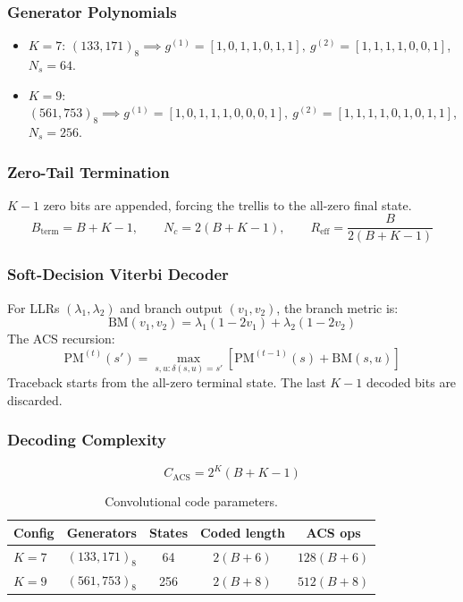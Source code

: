 \documentclass[12pt, a4paper]{article}
\begin{document}
\subsubsection{Generator Polynomials}
\begin{itemize}
    \item $K=7$: $(133,171)_8 \implies g^{(1)}=[1,0,1,1,0,1,1],\ g^{(2)}=[1,1,1,1,0,0,1]$, $N_s=64$.
    \item $K=9$: $(561,753)_8 \implies g^{(1)}=[1,0,1,1,1,0,0,0,1],\ g^{(2)}=[1,1,1,1,0,1,0,1,1]$, $N_s=256$.
\end{itemize}

\subsubsection{Zero-Tail Termination}
$K-1$ zero bits are appended, forcing the trellis to the all-zero final state.
\begin{equation}
B_{\text{term}} = B + K - 1,\qquad N_c = 2(B+K-1),\qquad R_{\text{eff}} = \frac{B}{2(B+K-1)}
\end{equation}

\subsubsection{Soft-Decision Viterbi Decoder}
For LLRs $(\lambda_1,\lambda_2)$ and branch output $(v_1,v_2)$, the branch metric is:
\begin{equation}
\text{BM}(v_1,v_2) = \lambda_1(1-2v_1) + \lambda_2(1-2v_2)
\end{equation}
The ACS recursion:
\begin{equation}
\text{PM}^{(t)}(s') = \max_{s,u:\delta(s,u)=s'}\left[\text{PM}^{(t-1)}(s) + \text{BM}(s,u)\right]
\end{equation}
Traceback starts from the all-zero terminal state. The last $K-1$ decoded bits are discarded.

\subsubsection{Decoding Complexity}
\begin{equation}
C_{\text{ACS}} = 2^K(B+K-1)
\end{equation}

\begin{table}[ht]
\centering
\caption{Convolutional code parameters.}
\begin{tabular}{lcccc}
\toprule
Config & Generators & States & Coded length & ACS ops \\
\midrule
$K=7$ & $(133,171)_8$ & 64  & $2(B+6)$ & $128(B+6)$ \\
$K=9$ & $(561,753)_8$ & 256 & $2(B+8)$ & $512(B+8)$ \\
\bottomrule
\end{tabular}
\end{table}
\end{document}
